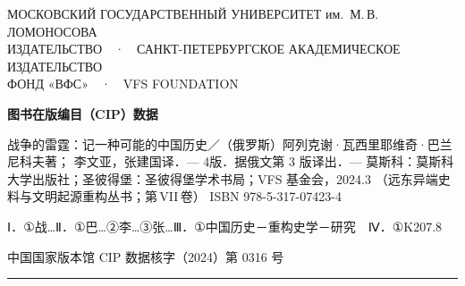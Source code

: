 \begin{minipage}[t][\dimexpr\textheight-24pt\relax][s]{\textwidth}
\centering

{\sffamily\scriptsize\color{pencil}
МОСКОВСКИЙ ГОСУДАРСТВЕННЫЙ УНИВЕРСИТЕТ им.\ М.\,В.\,ЛОМОНОСОВА\\
ИЗДАТЕЛЬСТВО\ \ ·\ \ САНКТ-ПЕТЕРБУРГСКОЕ АКАДЕМИЧЕСКОЕ ИЗДАТЕЛЬСТВО\\
ФОНД «ВФС»\ \ ·\ \ VFS FOUNDATION\par}

\vspace{3.2mm}
{\bfseries 图书在版编目（CIP）数据\par}
\vspace{2mm}

\begin{minipage}{0.94\textwidth}
\raggedright
战争的雷霆：记一种可能的中国历史／（俄罗斯）阿列克谢·瓦西里耶维奇·巴兰尼科夫著；
李文亚，张建国译．— 4版．据俄文第 3 版译出．— 莫斯科：莫斯科大学出版社；圣彼得堡：圣彼得堡学术书局；VFS 基金会，2024.3
（远东异端史料与文明起源重构丛书；第\,VII\,卷）
ISBN 978-5-317-07423-4

\vspace{1.4mm}
\hspace{2em}Ⅰ．①战…\quad Ⅱ．①巴…②李…③张…\quad Ⅲ．①中国历史－重构史学－研究\ \ Ⅳ．①K207.8

\vspace{1.4mm}
\hspace{2em}中国国家版本馆 CIP 数据核字（2024）第 0316 号
\end{minipage}

\vspace{3.2mm}
{\color{rulegrey}\rule{0.94\textwidth}{0.3pt}}
\vspace{2.4mm}


\end{minipage}

